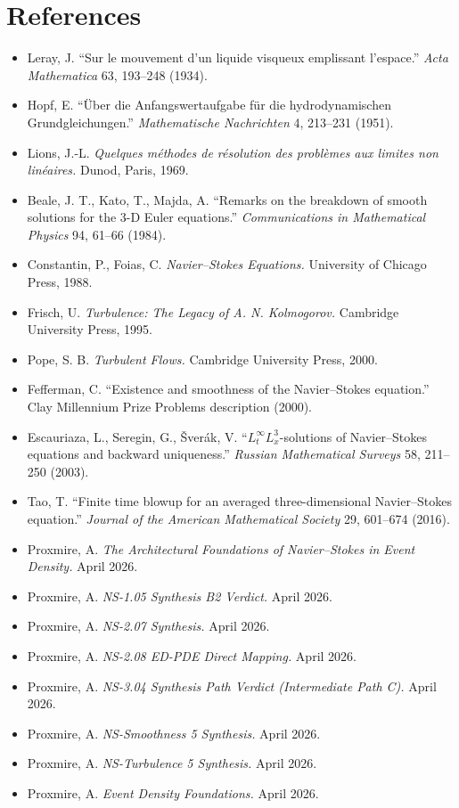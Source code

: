 \documentclass[11pt,a4paper]{article}
\begin{document}
\section*{References}

\begin{itemize}[leftmargin=*,itemsep=2pt]
  \item Leray, J. ``Sur le mouvement d'un liquide visqueux emplissant l'espace.'' \emph{Acta Mathematica} 63, 193--248 (1934).
  \item Hopf, E. ``\"Uber die Anfangswertaufgabe f\"ur die hydrodynamischen Grundgleichungen.'' \emph{Mathematische Nachrichten} 4, 213--231 (1951).
  \item Lions, J.-L. \emph{Quelques m\'ethodes de r\'esolution des probl\`emes aux limites non lin\'eaires.} Dunod, Paris, 1969.
  \item Beale, J. T., Kato, T., Majda, A. ``Remarks on the breakdown of smooth solutions for the 3-D Euler equations.'' \emph{Communications in Mathematical Physics} 94, 61--66 (1984).
  \item Constantin, P., Foias, C. \emph{Navier--Stokes Equations.} University of Chicago Press, 1988.
  \item Frisch, U. \emph{Turbulence: The Legacy of A. N. Kolmogorov.} Cambridge University Press, 1995.
  \item Pope, S. B. \emph{Turbulent Flows.} Cambridge University Press, 2000.
  \item Fefferman, C. ``Existence and smoothness of the Navier--Stokes equation.'' Clay Millennium Prize Problems description (2000).
  \item Escauriaza, L., Seregin, G., \v Sver\'ak, V. ``$L^\infty_t L^3_x$-solutions of Navier--Stokes equations and backward uniqueness.'' \emph{Russian Mathematical Surveys} 58, 211--250 (2003).
  \item Tao, T. ``Finite time blowup for an averaged three-dimensional Navier--Stokes equation.'' \emph{Journal of the American Mathematical Society} 29, 601--674 (2016).
  \item Proxmire, A. \emph{The Architectural Foundations of Navier--Stokes in Event Density.} April 2026.
  \item Proxmire, A. \emph{NS-1.05 Synthesis B2 Verdict.} April 2026.
  \item Proxmire, A. \emph{NS-2.07 Synthesis.} April 2026.
  \item Proxmire, A. \emph{NS-2.08 ED-PDE Direct Mapping.} April 2026.
  \item Proxmire, A. \emph{NS-3.04 Synthesis Path Verdict (Intermediate Path C).} April 2026.
  \item Proxmire, A. \emph{NS-Smoothness 5 Synthesis.} April 2026.
  \item Proxmire, A. \emph{NS-Turbulence 5 Synthesis.} April 2026.
  \item Proxmire, A. \emph{Event Density Foundations.} April 2026.
\end{itemize}
\end{document}
